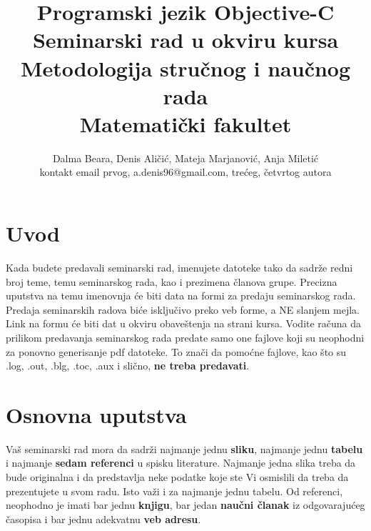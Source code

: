 \documentclass[a4paper]{article}
\begin{document}
\title{Programski jezik Objective-C\\ \small{Seminarski rad u okviru kursa\\Metodologija stručnog i naučnog rada\\ Matematički fakultet}}

\author{Dalma Beara, Denis Aličić, Mateja Marjanović, Anja Miletić\\ kontakt email prvog, a.denis96@gmail.com, trećeg, četvrtog autora}


\maketitle


\tableofcontents

\newpage

\section{Uvod}
\label{sec:uvod}

Kada budete predavali seminarski rad, imenujete datoteke tako da sadrže redni broj teme, temu seminarskog rada, kao i prezimena članova grupe. Precizna uputstva na temu imenovnja će biti data na formi za predaju seminarskog rada. Predaja seminarskih radova biće isključivo preko veb forme, a NE slanjem mejla. Link na formu će biti dat u okviru obaveštenja na strani kursa. Vodite računa da prilikom predavanja seminarskog rada predate samo one fajlove koji su neophodni za ponovno generisanje pdf datoteke. To znači da pomoćne fajlove, kao što su .log, .out, .blg, .toc, .aux i slično, \textbf{ne treba predavati}.

\section{Osnovna uputstva}
Vaš seminarski rad mora da sadrži najmanje jednu \textbf{sliku}, najmanje jednu \textbf{tabelu} i najmanje \textbf{sedam referenci} u spisku literature. Najmanje jedna slika treba da bude originalna i da predstavlja neke podatke koje ste Vi osmislili da treba da prezentujete u svom radu. Isto važi i za najmanje jednu tabelu. 	Od referenci, neophodno je imati bar jednu \textbf{knjigu}, bar jedan \textbf{naučni članak} iz odgovarajućeg časopisa i bar jednu adekvatnu \textbf{veb adresu}. 
\end{document}

